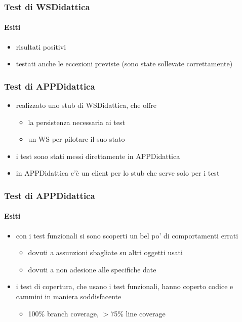 \begin{frame}
\frametitle{Test di WSDidattica}
\framesubtitle{Esiti}

\begin{itemize}
\item risultati positivi
\item testati anche le eccezioni previste (sono state sollevate correttamente)
\end{itemize}

\end{frame}

\begin{frame}
\frametitle{Test di APPDidattica}
\begin{itemize}
\item realizzato uno stub di WSDidattica, che offre
\begin{itemize}
\item la persistenza necessaria ai test
\item un WS per pilotare il suo stato
\end{itemize}

\item i test sono stati messi direttamente in APPDidattica
\item in APPDidattica c'è un client per lo stub che serve solo per i test
\end{itemize}

\end{frame}

\begin{frame}
\frametitle{Test di APPDidattica}
\framesubtitle{Esiti}

\begin{itemize}
\item con i test funzionali si sono scoperti un bel po' di comportamenti errati
\begin{itemize}
\item dovuti a assunzioni sbagliate su altri oggetti usati
\item dovuti a non adesione alle specifiche date
\end{itemize}

\item i test di copertura, che usano i test funzionali, hanno coperto codice  e cammini in maniera soddisfacente
\begin{itemize}
\item 100\% branch coverage, $>$75\% line coverage
\end{itemize}

\end{itemize}

\end{frame}

